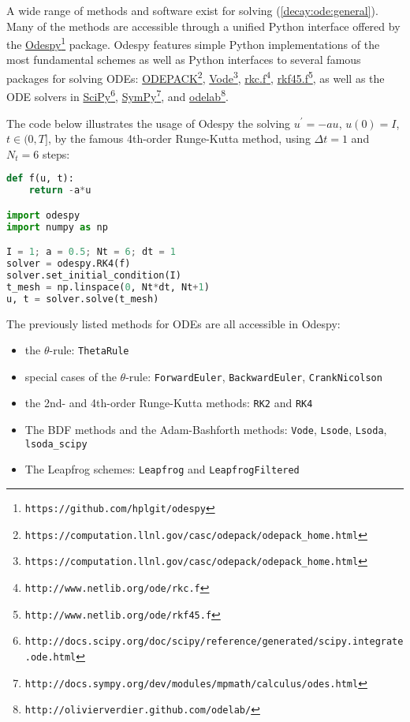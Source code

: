 \documentclass[graybox,sectrefs,envcountresetchap,open=right,final]{svmonodo}
\begin{document}
A wide range of methods and software exist for solving (\ref{decay:ode:general}).
Many of the methods are accessible through a unified Python interface offered
by the \href{{https://github.com/hplgit/odespy}}{Odespy}\footnote{\texttt{https://github.com/hplgit/odespy}} \cite{odespy} package.
Odespy features simple Python implementations of the most fundamental
schemes as well as Python interfaces to several famous packages for
solving ODEs: \href{{https://computation.llnl.gov/casc/odepack/odepack_home.html}}{ODEPACK}\footnote{\texttt{https://computation.llnl.gov/casc/odepack/odepack\_home.html}}, \href{{https://computation.llnl.gov/casc/odepack/odepack_home.html}}{Vode}\footnote{\texttt{https://computation.llnl.gov/casc/odepack/odepack\_home.html}},
\href{{http://www.netlib.org/ode/rkc.f}}{rkc.f}\footnote{\texttt{http://www.netlib.org/ode/rkc.f}}, \href{{http://www.netlib.org/ode/rkf45.f}}{rkf45.f}\footnote{\texttt{http://www.netlib.org/ode/rkf45.f}}, as well
as the ODE solvers in \href{{http://docs.scipy.org/doc/scipy/reference/generated/scipy.integrate.ode.html}}{SciPy}\footnote{\texttt{http://docs.scipy.org/doc/scipy/reference/generated/scipy.integrate.ode.html}}, \href{{http://docs.sympy.org/dev/modules/mpmath/calculus/odes.html}}{SymPy}\footnote{\texttt{http://docs.sympy.org/dev/modules/mpmath/calculus/odes.html}}, and \href{{http://olivierverdier.github.com/odelab/}}{odelab}\footnote{\texttt{http://olivierverdier.github.com/odelab/}}.

The code below illustrates the usage of Odespy the solving $u^{\prime}=-au$,
$u(0)=I$, $t\in (0,T]$,
by the famous 4th-order Runge-Kutta method, using $\Delta t=1$
and $N_t=6$ steps:

\begin{lstlisting}[language=Python,style=blue1bar_bluegreen]
def f(u, t):
    return -a*u

import odespy
import numpy as np

I = 1; a = 0.5; Nt = 6; dt = 1
solver = odespy.RK4(f)
solver.set_initial_condition(I)
t_mesh = np.linspace(0, Nt*dt, Nt+1)
u, t = solver.solve(t_mesh)
\end{lstlisting}

The previously listed methods for ODEs are all accessible in
Odespy:

\begin{itemize}
 \item the $\theta$-rule: \texttt{ThetaRule}

 \item special cases of the $\theta$-rule: \texttt{ForwardEuler}, \texttt{BackwardEuler},
   \texttt{CrankNicolson}

 \item the 2nd- and 4th-order Runge-Kutta methods: \texttt{RK2} and \texttt{RK4}

 \item The BDF methods and the Adam-Bashforth methods:
   \texttt{Vode}, \texttt{Lsode}, \texttt{Lsoda}, \Verb!lsoda_scipy!

 \item The Leapfrog schemes: \texttt{Leapfrog} and \texttt{LeapfrogFiltered}
\end{itemize}
\end{document}

